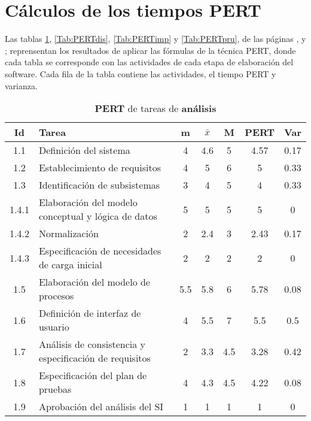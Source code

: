 \documentclass[11pt,a4paper,spanish,twoside]{report}
\begin{document}
\section{Cálculos de los tiempos PERT}
Las tablas \ref{Tab:PERTana}, \ref{Tab:PERTdis}, \ref{Tab:PERTimp} y
\ref{Tab:PERTpru}, de las páginas \pageref{Tab:PERTana}, \pageref{Tab:PERTdis} y
\pageref{Tab:PERTpru}; reprensentan los resultados de aplicar las fórmulas de la
técnica PERT, donde cada tabla se corresponde con las actividades de cada
etapa de elaboración del software. Cada fila de la tabla contiene las
actividades, el tiempo PERT y varianza.

\begin{table}[!h]
  \centering
  \begin{tabular}{|c||p{5.3cm}||c|c|c||c|c|}
    \hline
    \textbf{Id} & \textbf{Tarea} & \textbf{m} & 
    \textbf{$\bar{x}$} &\textbf{M} & \textbf{PERT} & \textbf{Var}\\
    \hline \hline
    1.1 & Definición del sistema & 4 & 4.6 & 5 & 4.57 & 0.17\\ 
    \hline
    1.2 & Establecimiento de requisitos & 4 & 5 & 6 & 5 & 0.33\\
    \hline 
    1.3 & Identificación de subsistemas & 3 & 4 & 5 & 4 & 0.33\\
    \hline
    1.4.1 & Elaboración del modelo conceptual y lógica de datos & 5 & 5 & 5 &
    5 & 0\\
    \hline
    1.4.2 & Normalización & 2 & 2.4 & 3 & 2.43 & 0.17\\
    \hline
    1.4.3 & Especificación de necesidades de carga inicial & 2 & 2 & 2 & 2 & 0\\
    \hline
    1.5 & Elaboración del modelo de procesos & 5.5 & 5.8 & 6 & 5.78 & 0.08\\
    \hline
    1.6 & Definición de interfaz de usuario & 4 & 5.5 & 7 & 5.5 & 0.5\\
    \hline
    1.7 & Análisis de consistencia y especificación de requisitos & 2 & 3.3
    & 4.5 & 3.28 & 0.42\\
    \hline
    1.8 & Especificación del plan de pruebas & 4 & 4.3 & 4.5 & 4.22 & 0.08\\
    \hline
    1.9 & Aprobación del análisis del SI & 1 & 1 & 1 & 1 & 0\\
    \hline
  \end{tabular}
  \caption{\textbf{PERT} de tareas de \textbf{análisis}} 
  \label{Tab:PERTana}
\end{table}
\end{document}
